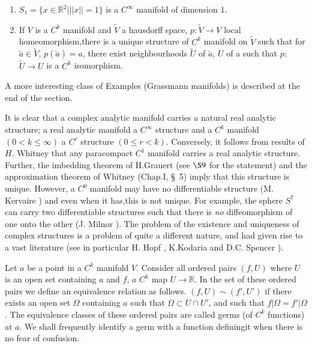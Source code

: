\begin{examples*}%
\begin{enumerate}[1.]
  \item $S_1 = \{x \in \mathbb{R}^2 \big | || x || = 1\}$ is a
    $C^\infty$ manifold of dimension $1$. 
  \item  If $V$  is a $C^k$ manifold and $\tilde{V}$ a hausdorff space,
    $p: \tilde{V} \to V$ local homeomorphism,\pageoriginale there is a unique
    structure of $C^k$ manifold on $\tilde{V}$ such that for
    $\tilde{a} \in \tilde{V}$, $p (\tilde{a}) = a$, there exist
    neighbourhoods $\tilde{U}$ of $\tilde{a}$, $U$ of a such that $p$:
    $\tilde{U} \to U$ is a $C^k$ isomorphism. 
  \end{enumerate}
\end{examples*}

A more interesting class of Examples (Grassmann manifolds) is 
described at the end of the section. 

It is clear that a complex analytic manifold carries a natural real
analytic structure; a real analytic manifold a $C^\infty$ structure
and a $C^k$ manifold $(0 < k \le \infty)$ a $C^r$ structure $(0 \le r
< k)$. Conversely, it follows from results of $H$. Whitney \cite{47} that
any paracompact $C^1$ manifold carries a real analytic
structure. Further, the imbedding theorem of H.Grauert \cite{13} (see $\S
9$ for the statement) and the approximation theorem of Whitney
(Chap.I, \S\ 5) imply that this structure is unique. However, a $C^0$
manifold may have no differentiable structure (M. Kervaire \cite{20}) and
even when it has,this is not unique. For example, the sphere $S^7$ can
carry two differentiable structures such that there is \textit{no}
diffeomorphism of one onto the other (J. Milnor \cite{28}). The problem
of the existence and uniqueness of complex structures is a problem of
quite a different nature, and had given rise to a vast literature (see
in particular H. Hopf \cite{16}, K.Kodaria and D.C. Spencer \cite{21}). 

Let $a$ be a point in a $C^k$ manifold $V$. Consider all ordered pairs
$(f, U)$ where $U$ is an open set containing $a$ and $f$, $a$ $C^k$ map
$U \to \mathbb{R}$. In the set of these ordered pairs we define an
equivalence relation as follows. $(f, U) \sim (f', U') $ if there
exists an open set $\Omega$ containing $a$ such that $\Omega \subset U
\cap U'$, and such that $f \big | \Omega = f' \big | \Omega$. The
equivalence classes of these ordered pairs are called germs (of $C^k$
functions) at $a$. We shall frequently identify a germ with a function
defining\pageoriginale it when there is no fear of confusion. 

